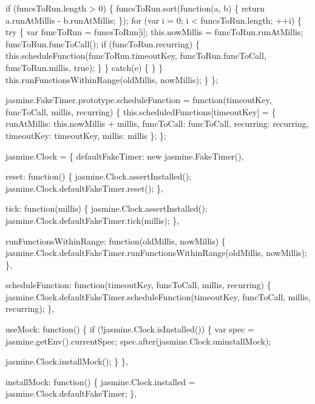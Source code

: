 \begin{DoxyCodeInclude}
  \textcolor{keywordflow}{if} (funcsToRun.length > 0) \{
    funcsToRun.sort(\textcolor{keyword}{function}(a, b) \{
      \textcolor{keywordflow}{return} a.runAtMillis - b.runAtMillis;
    \});
    \textcolor{keywordflow}{for} (var i = 0; i < funcsToRun.length; ++i) \{
      \textcolor{keywordflow}{try} \{
        var funcToRun = funcsToRun[i];
        this.nowMillis = funcToRun.runAtMillis;
        funcToRun.funcToCall();
        \textcolor{keywordflow}{if} (funcToRun.recurring) \{
          this.scheduleFunction(funcToRun.timeoutKey,
              funcToRun.funcToCall,
              funcToRun.millis,
              \textcolor{keyword}{true});
        \}
      \} \textcolor{keywordflow}{catch}(e) \{
      \}
    \}
    this.runFunctionsWithinRange(oldMillis, nowMillis);
  \}
\};

jasmine.FakeTimer.prototype.scheduleFunction = \textcolor{keyword}{function}(timeoutKey, funcToCall, millis, recurring) \{
  this.scheduledFunctions[timeoutKey] = \{
    runAtMillis: this.nowMillis + millis,
    funcToCall: funcToCall,
    recurring: recurring,
    timeoutKey: timeoutKey,
    millis: millis
  \};
\};

jasmine.Clock = \{
  defaultFakeTimer: \textcolor{keyword}{new} jasmine.FakeTimer(),

  reset: \textcolor{keyword}{function}() \{
    jasmine.Clock.assertInstalled();
    jasmine.Clock.defaultFakeTimer.reset();
  \},

  tick: \textcolor{keyword}{function}(millis) \{
    jasmine.Clock.assertInstalled();
    jasmine.Clock.defaultFakeTimer.tick(millis);
  \},

  runFunctionsWithinRange: \textcolor{keyword}{function}(oldMillis, nowMillis) \{
    jasmine.Clock.defaultFakeTimer.runFunctionsWithinRange(oldMillis, nowMillis);
  \},

  scheduleFunction: \textcolor{keyword}{function}(timeoutKey, funcToCall, millis, recurring) \{
    jasmine.Clock.defaultFakeTimer.scheduleFunction(timeoutKey, funcToCall, millis, recurring);
  \},

  useMock: \textcolor{keyword}{function}() \{
    \textcolor{keywordflow}{if} (!jasmine.Clock.isInstalled()) \{
      var spec = jasmine.getEnv().currentSpec;
      spec.after(jasmine.Clock.uninstallMock);

      jasmine.Clock.installMock();
    \}
  \},

  installMock: \textcolor{keyword}{function}() \{
    jasmine.Clock.installed = jasmine.Clock.defaultFakeTimer;
  \},


\end{DoxyCodeInclude}
